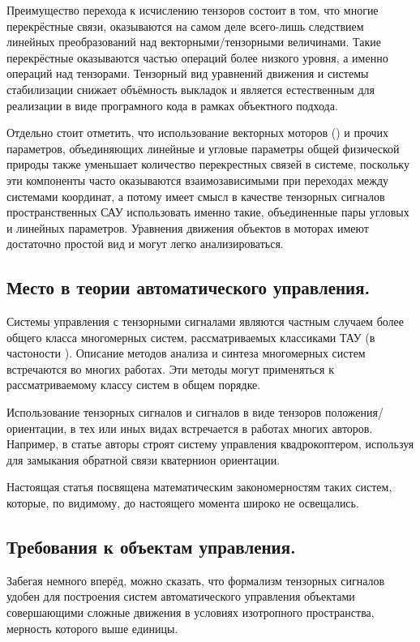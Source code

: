 \documentclass[a4paper]{article}
\begin{document}
Преимущество перехода к исчислению тензоров состоит в том, что многие перекрёстные связи, оказываются на самом деле всего-лишь следствием линейных преобразований над векторными/тензорными величинами. Такие перекрёстные оказываются частью операций более низкого уровня, а именно операций над тензорами. Тензорный вид уравнений движения и системы стабилизации снижает объёмность выкладок и является естественным для реализации в виде програмного кода в рамках объектного подхода. 

Отдельно стоит отметить, что использование векторных моторов (\cite{motor}) и прочих параметров, объединяющих линейные и угловые параметры общей физической природы также уменьшает количество перекрестных связей в системе, поскольку эти компоненты часто оказываются взаимозависимыми при переходах между системами координат, а потому имеет смысл в качестве тензорных сигналов пространственных САУ использовать именно такие, объединенные пары угловых и линейных параметров. Уравнения движения объектов в моторах имеют достаточно простой вид и могут легко анализироваться.

\subsection{Место в теории автоматического управления.}
Системы управления с тензорными сигналами являются частным случаем более общего класса многомерных систем, рассматриваемых классиками ТАУ (в частоности \cite{tau}). Описание методов анализа и синтеза многомерных систем встречаются во многих работах. Эти методы могут применяться к рассматриваемому классу систем в общем порядке. 

Использование тензорных сигналов и сигналов в виде тензоров положения/ориентации, в тех или иных видах встречается в работах многих авторов. Например, в статье \cite{quadrotor} авторы строят систему управления квадрокоптером, используя для замыкания обратной связи кватернион ориентации. 

Настоящая статья посвящена математическим закономерностям таких систем, которые, по видимому, до настоящего момента широко не освещались.

\subsection{Требования к объектам управления.}
Забегая немного вперёд, можно сказать, что формализм тензорных сигналов удобен для построения систем автоматического управления объектами совершающими сложные движения в условиях изотропного пространства, мерность которого выше единицы.
\end{document}
